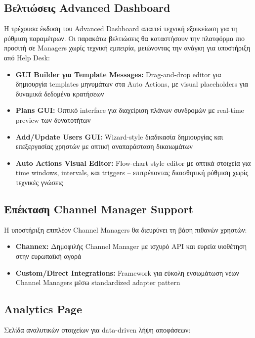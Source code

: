 \documentclass[
	12pt, %
	oneside, %
	greek,
	onehalfspacing, %
	liststotoc, %
	toctotoc, %
	parskip, %
	headsepline, %
]{MastersDoctoralThesis} %
\begin{document}
\subsection{Βελτιώσεις Advanced Dashboard}

Η τρέχουσα έκδοση του Advanced Dashboard απαιτεί τεχνική εξοικείωση για τη ρύθμιση παραμέτρων. Οι παρακάτω βελτιώσεις θα καταστήσουν την πλατφόρμα πιο προσιτή σε Managers χωρίς τεχνική εμπειρία, μειώνοντας την ανάγκη για υποστήριξη από Help Desk:

\begin{itemize}
    \item \textbf{GUI Builder για Template Messages:} Drag-and-drop editor για δημιουργία templates μηνυμάτων στα Auto Actions, με visual placeholders για δυναμικά δεδομένα κρατήσεων
    \item \textbf{Plans GUI:} Οπτικό interface για διαχείριση πλάνων συνδρομών με real-time preview των δυνατοτήτων
    \item \textbf{Add/Update Users GUI:} Wizard-style διαδικασία δημιουργίας και επεξεργασίας χρηστών με οπτική αναπαράσταση δικαιωμάτων
    \item \textbf{Auto Actions Visual Editor:} Flow-chart style editor με οπτικά στοιχεία για time windows, intervals, και triggers -- επιτρέποντας διαισθητική ρύθμιση χωρίς τεχνικές γνώσεις
\end{itemize}

\subsection{Επέκταση Channel Manager Support}

Η υποστήριξη επιπλέον Channel Managers θα διευρύνει τη βάση πιθανών χρηστών:

\begin{itemize}
    \item \textbf{Channex:} Δημοφιλής Channel Manager με ισχυρό API και ευρεία υιοθέτηση στην ευρωπαϊκή αγορά
    \item \textbf{Custom/Direct Integrations:} Framework για εύκολη ενσωμάτωση νέων Channel Managers μέσω standardized adapter pattern
\end{itemize}

\subsection{Analytics Page}

Σελίδα αναλυτικών στοιχείων για data-driven λήψη αποφάσεων:
\end{document}
